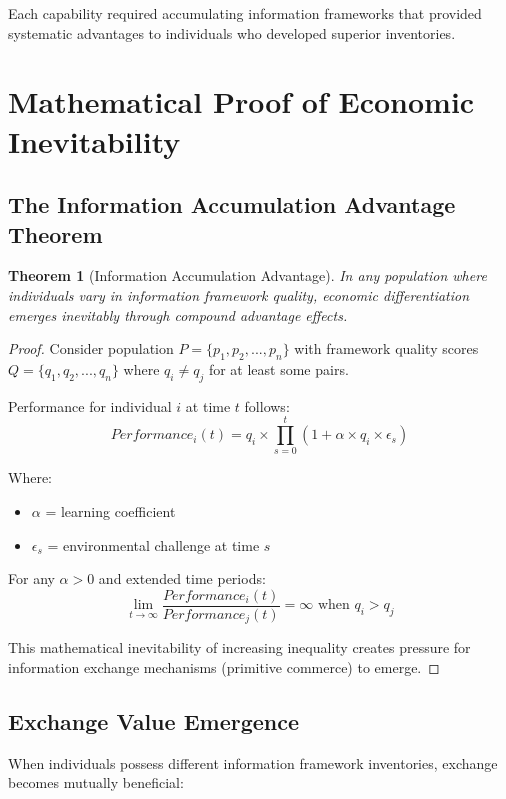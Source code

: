 \documentclass[12pt,a4paper]{article}
\newtheorem{theorem}{Theorem}
\begin{document}
Each capability required accumulating information frameworks that provided systematic advantages to individuals who developed superior inventories.

\section{Mathematical Proof of Economic Inevitability}

\subsection{The Information Accumulation Advantage Theorem}

\begin{theorem}[Information Accumulation Advantage]
In any population where individuals vary in information framework quality, economic differentiation emerges inevitably through compound advantage effects.
\end{theorem}

\begin{proof}
Consider population $P = \{p_1, p_2, ..., p_n\}$ with framework quality scores $Q = \{q_1, q_2, ..., q_n\}$ where $q_i \neq q_j$ for at least some pairs.

Performance for individual $i$ at time $t$ follows:
$$Performance_i(t) = q_i \times \prod_{s=0}^{t} (1 + \alpha \times q_i \times \epsilon_s)$$

Where:
\begin{itemize}
\item $\alpha$ = learning coefficient 
\item $\epsilon_s$ = environmental challenge at time $s$
\end{itemize}

For any $\alpha > 0$ and extended time periods:
$$\lim_{t \rightarrow \infty} \frac{Performance_i(t)}{Performance_j(t)} = \infty \text{ when } q_i > q_j$$

This mathematical inevitability of increasing inequality creates pressure for information exchange mechanisms (primitive commerce) to emerge.
\end{proof}

\subsection{Exchange Value Emergence}

When individuals possess different information framework inventories, exchange becomes mutually beneficial:
\end{document}

